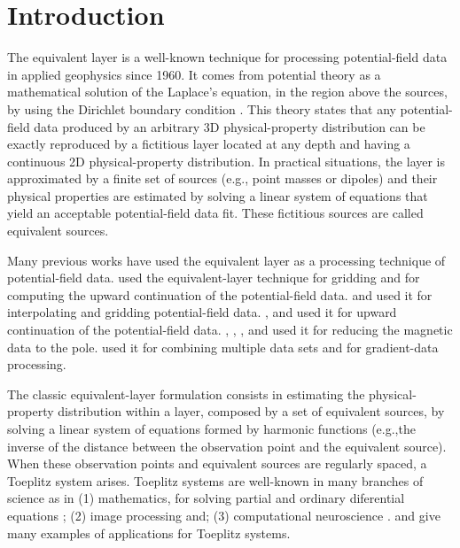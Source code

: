 \section{Introduction}

The equivalent layer is a well-known technique for processing potential-field data in applied geophysics since 1960. 
It comes from potential theory as a mathematical solution of the Laplace's equation, in the region above the sources, 
by using the Dirichlet boundary condition \citep{kellogg1929}.
This theory states that any potential-field data produced by an arbitrary 3D physical-property distribution can be 
exactly reproduced by a fictitious layer located at any depth and having a continuous 2D physical-property  
distribution. In practical situations, the layer is approximated by a finite set of sources (e.g., point masses or 
dipoles) and their physical properties are estimated by solving a linear system of equations that yield an 
acceptable potential-field data fit. These fictitious sources are called equivalent sources.

Many previous works have used the equivalent layer as a processing technique of potential-field data. 
\citet{dampney1969} used the equivalent-layer technique for gridding and for computing the upward 
continuation of the potential-field data. \citet{cordell1992} and \citet{mendonca-silva1994} used it for 
interpolating and gridding potential-field data. \citet{emilia1973}, \citet{hansen-miyazaki1984} and 
\citet{li-oldenburg2010} used it for upward continuation of the potential-field data. \citet{silva1986}, 
\citet{leao-silva1989}, \citet{guspi-novara2009}, and \citet{oliveirajr-etal2013} used it for reducing the 
magnetic data to the pole. \citet{boggs-dransfield2004} used it for combining multiple data sets and 
\citet{barnes-lumley2011} for gradient-data processing.

The classic equivalent-layer formulation consists in estimating the physical-property distribution within a layer, 
composed by a set of equivalent sources, by solving a linear system of equations formed by harmonic functions 
(e.g.,the inverse of the distance between the observation point and the equivalent source). When these observation 
points and equivalent sources are regularly spaced, a Toeplitz system arises. Toeplitz systems are well-known in 
many branches of science as in (1) mathematics, for solving partial and ordinary diferential equations 
\citep[e.g.,][]{lin-etal2003}; (2) image processing \citep[e.g.,][]{chan-etal1999} and; (3) computational 
neuroscience \citep[e.g.,][]{wray-green1994}. \citet{jin2003} and \citet{chan-jin2007} give many examples of 
applications for Toeplitz systems.

